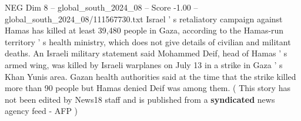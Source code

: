 \begin{textsample}{NEG Dim 8 – global\_south\_2024\_08 – Score -1.00 – global\_south\_2024\_08/111567730.txt}
Israel ' s retaliatory campaign against Hamas has killed at least 39,480 people in Gaza, according to the Hamas-run territory ' s health ministry, which does not give details of civilian and militant deaths.
An Israeli military statement said Mohammed Deif, head of Hamas ' s armed wing, was killed by Israeli warplanes on July 13 in a strike in Gaza ' s Khan Yunis area.
Gazan health authorities said at the time that the strike killed more than 90 people but Hamas denied Deif was among them. ( This story has not been edited by News18 staff and is published from a \textbf{syndicated} news agency feed - AFP )

\end{textsample}
